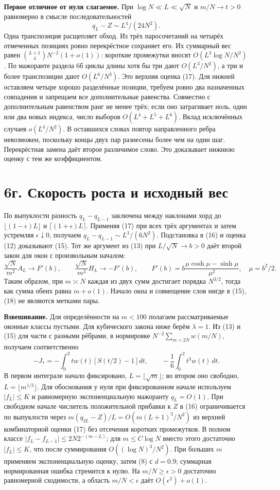 \documentclass[11pt,a4paper]{article}
\newcommand{\sect}[1]{\section*{\sffamily\color{ink}#1}}
\newcommand{\subt}[1]{\par\medskip\noindent\textbf{#1.}\quad}
\begin{document}
\subt{Первое отличное от нуля слагаемое} При $\log N\ll L\ll\sqrt N$ и $m/N\to t>0$ равномерно в смысле последовательностей
\[
                          q_L-Z\sim L^4/(24N^2).                            \tag{17}
\]
Одна транспозиция расщепляет обход. Из трёх паросочетаний на четырёх отмеченных позициях ровно перекрёстное сохраняет его. Их суммарный вес равен $\binom{L+1}{4}N^{-2}(1+o(1))$: короткие промежутки вносят $O(L^3\log N/N^2)$. По мажоранте раздела 6б циклы длины хотя бы три дают $O(L^3/N^2)$, а три и более транспозиции дают $O(L^6/N^3)$. Это верхняя оценка (17). Для нижней оставляем четыре хорошо разделённые позиции, требуем ровно два назначенных совпадения и запрещаем все дополнительные равенства. Совместно с дополнительным равенством ранг не менее трёх; если оно затрагивает ноль, один или два новых индекса, число выборов $O(L^4+L^5+L^6)$. Вклад исключённых случаев $o(L^4/N^2)$. В оставшихся словах повтор направленного ребра невозможен, поскольку концы двух пар разнесены более чем на один шаг. Перекрёстная замена даёт второе различимое слово. Это доказывает нижнюю оценку с тем же коэффициентом.
\newpage
\sect{6г. Скорость роста и исходный вес}
По выпуклости разность $q_L-q_{L-1}$ заключена между наклонами хорд до $\lfloor(1-\epsilon)L\rfloor$ и $\lceil(1+\epsilon)L\rceil$. Применяя (17) при всех трёх аргументах и затем устремляя $\epsilon\downarrow0$, получаем $q_L-q_{L-1}\sim L^3/(6N^2)$. Подстановка в (16) и оценка (12) доказывают (15). Тот же аргумент из (13) при $L/\sqrt N\to b>0$ даёт второй закон для окон с произвольным началом:
\[
   \frac{\sqrt N}{m^2} A_L\to F'(b),\qquad
   \frac{\sqrt N}{m^2} H_L\to -F'(b),\qquad
   F'(b)=b\frac{\mu\cosh\mu-\sinh\mu}{\mu^2},\quad \mu=b^2/2.              \tag{18}
\]
Таким образом, при $m\asymp N$ каждая из двух сумм достигает порядка $N^{3/2}$, тогда как сумма обеих равна $m+o(1)$. Начало окна и совмещение слов нигде в (15),(18) не являются метками пары.

\subt{Взвешивание} Для определённости на $m<100$ полагаем рассматриваемые оконные классы пустыми. Для кубического закона ниже берём $\lambda=1$. Из (13) и (15) для части с разными рёбрами, в нормировке $N^{-2}\sum_{m<2N}w(m/N)$, получаем соответственно
\[
 -J_*=-\int_0^2 t w(t)[S(t/2)-1]dt,\qquad
                   -\frac16\int_0^2t^3 w(t)\,dt .                           \tag{19}
\]
В первом интеграле начало фиксировано, $L=\lfloor\sqrt m\rfloor$; во втором оно свободно, $L=\lfloor m^{1/3}\rfloor$. Для обоснования у нуля при фиксированном начале используем $|f_L|\le K$ и равномерную экспоненциальную мажоранту $q_L=O(1)$. При свободном начале числитель положительной прибавки к $Z$ в (16) ограничивается по выпуклости через $m(q_{2L}-Z)/L=O(m(L+1)^3/N^2)$ из верхней комбинаторной оценки (17) без отсечения коротких промежутков. В полном классе $|f_L-f_{L-1}|\le 2N2^{-(m-L)}$; для $m\le C\log N$ вместо этого достаточно $|f_L|\le K$, что после суммирования $O((\log N)^3/N^2)$. При больших $m$ применяем экспоненциальную оценку, затем (8) с $d=0.9$; суммарная нормированная ошибка стремится к нулю. На $m/N\ge\epsilon>0$ достаточно равномерной сходимости, а область $m/N<\epsilon$ даёт $O(\epsilon^2)+o(1)$.
\end{document}
